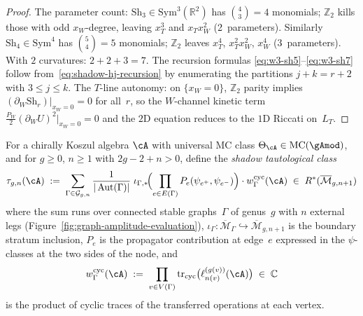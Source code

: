 \begin{proof}
The parameter count: $\mathrm{Sh}_3 \in \mathrm{Sym}^3(\mathbb{R}^2)$
has $\binom{4}{3} = 4$ monomials; $\mathbb{Z}_2$ kills
those with odd $x_W$-degree, leaving $x_T^3$ and $x_T x_W^2$
(2~parameters).  Similarly $\mathrm{Sh}_4 \in \mathrm{Sym}^4$
has $\binom{5}{4} = 5$ monomials; $\mathbb{Z}_2$ leaves
$x_T^4$, $x_T^2 x_W^2$, $x_W^4$
(3~parameters).
With $2$ curvatures: $2 + 2 + 3 = 7$.
The recursion formulas
\eqref{eq:w3-sh5}--\eqref{eq:w3-sh7}
follow from~\eqref{eq:shadow-hj-recursion} by
enumerating the partitions $j + k = r + 2$
with $3 \leq j \leq k$.
The $T$-line autonomy: on $\{x_W = 0\}$,
$\mathbb{Z}_2$ parity implies
$(\partial_W \mathrm{Sh}_r)|_{x_W = 0} = 0$ for all~$r$,
so the $W$-channel kinetic term
$\frac{P_W}{2}(\partial_W U)^2\big|_{x_W = 0} = 0$
and the $2$D equation reduces to the $1$D Riccati
on~$L_T$.
\end{proof}

\begin{definition}
\label{def:shadow-tautological-classes}
For a chirally Koszul algebra $\cA$ with universal MC class
$\Theta_\cA \in \operatorname{MC}(\gAmod)$, and for
$g \geq 0$, $n \geq 1$ with $2g - 2 + n > 0$, define
the \emph{shadow tautological class}
\begin{equation}\label{eq:shadow-tautological-class}
\tau_{g,n}(\cA)
\;:=\;
\sum_{\Gamma \in \mathcal{G}_{g,n}}
\frac{1}{|\operatorname{Aut}(\Gamma)|}
\;\iota_{\Gamma,*}\!\Bigl(
\prod_{e \in E(\Gamma)}
  P_e(\psi_{e^+}, \psi_{e^-})
\Bigr)
\cdot w_\Gamma^{\mathrm{cyc}}(\cA)
\;\in\; R^*(\overline{\mathcal{M}}_{g,n+1})
\end{equation}
where the sum runs over connected stable graphs~$\Gamma$ of
genus~$g$ with $n$ external legs
\textup{(}Figure~\textup{\ref{fig:graph-amplitude-evaluation})},
$\iota_\Gamma\colon \overline{\mathcal{M}}_\Gamma
\hookrightarrow \overline{\mathcal{M}}_{g,n+1}$
is the boundary stratum inclusion,
$P_e$ is the propagator contribution at edge~$e$ expressed in
the $\psi$-classes at the two sides of the node, and
\begin{equation}\label{eq:vertex-weight-cyclic}
w_\Gamma^{\mathrm{cyc}}(\cA)
\;:=\;
\prod_{v \in V(\Gamma)}
\operatorname{tr}_{\mathrm{cyc}}
\bigl(\ell_{n(v)}^{(g(v))}(\cA)\bigr)
\;\in\; \mathbb{C}
\end{equation}
is the product of cyclic traces of the transferred operations
at each vertex.
\end{definition}

